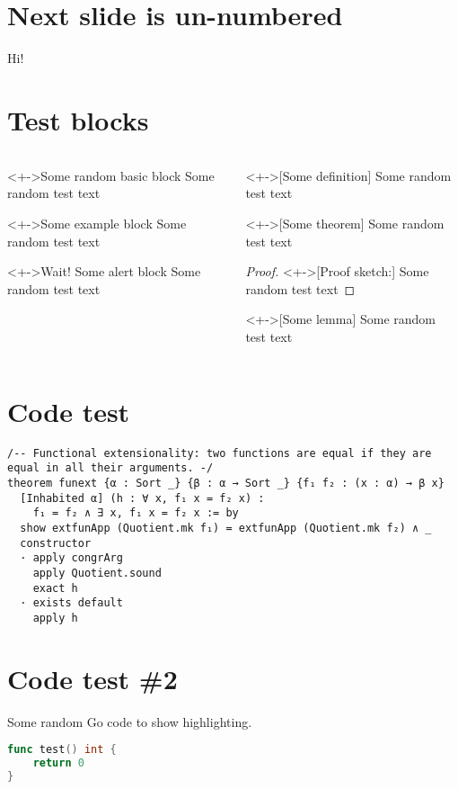 \documentclass[%
    listings={
        Lean=listings-lean,
        Go
    }
]{custom}
\begin{document}
\section{Next slide is un-numbered}
\begin{sframe*}
	Hi!
\end{sframe*}

\section{Test blocks}
\begin{sframe}
	\begin{columns}
		\begin{column}{.45\linewidth}
			\begin{block}<+->{Some random basic block}
				Some random test text
			\end{block}
			\begin{exampleblock}<+->{Some example block}
				Some random test text
			\end{exampleblock}
			\begin{alertblock}<+->{Wait! Some alert block}
				Some random test text
			\end{alertblock}
		\end{column}
		\begin{column}{.45\linewidth}
			\begin{definition}<+->[Some definition]
				Some random test text
			\end{definition}
			\begin{theorem}<+->[Some theorem]
				Some random test text
			\end{theorem}
			\begin{proof}<+->[Proof sketch:]
				Some random test text
			\end{proof}
			\begin{lemma}<+->[Some lemma]
				Some random test text
			\end{lemma}
		\end{column}
	\end{columns}
\end{sframe}

\section{Code test}
\begin{sframe}[fragile]
	\begin{lstlisting}[language=Lean]
/-- Functional extensionality: two functions are equal if they are equal in all their arguments. -/
theorem funext {α : Sort _} {β : α → Sort _} {f₁ f₂ : (x : α) → β x}
  [Inhabited α] (h : ∀ x, f₁ x = f₂ x) : 
    f₁ = f₂ ∧ ∃ x, f₁ x = f₂ x := by
  show extfunApp (Quotient.mk f₁) = extfunApp (Quotient.mk f₂) ∧ _
  constructor 
  · apply congrArg
    apply Quotient.sound
    exact h
  · exists default
    apply h
\end{lstlisting}
\end{sframe}

\section{Code test \#2}
\begin{sframe}[fragile]
	Some random Go code to show highlighting.

	\begin{lstlisting}[language=Go]
func test() int {
    return 0
}
\end{lstlisting}
\end{sframe}
\end{document}
